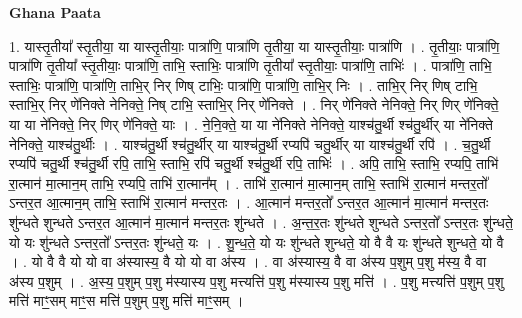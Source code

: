 \documentclass[17pt]{extarticle}
\begin{document}
\textbf{Ghana Paata } \newline

1. यास्तृ॒तीया᳚ स्तृ॒तीया॒ या यास्तृ॒तीयाः॒ पात्रा॑णि॒ पात्रा॑णि तृ॒तीया॒ या यास्तृ॒तीयाः॒ पात्रा॑णि । . तृ॒तीयाः॒ पात्रा॑णि॒ पात्रा॑णि तृ॒तीया᳚ स्तृ॒तीयाः॒ पात्रा॑णि॒ ताभि॒ स्ताभिः॒ पात्रा॑णि तृ॒तीया᳚ स्तृ॒तीयाः॒ पात्रा॑णि॒ ताभिः॑ । . पात्रा॑णि॒ ताभि॒ स्ताभिः॒ पात्रा॑णि॒ पात्रा॑णि॒ ताभि॒र् निर् णिष् टाभिः॒ पात्रा॑णि॒ पात्रा॑णि॒ ताभि॒र् निः । . ताभि॒र् निर् णिष् टाभि॒ स्ताभि॒र् निर् णे॑निक्ते नेनिक्ते॒ निष् टाभि॒ स्ताभि॒र् निर् णे॑निक्ते । . निर् णे॑निक्ते नेनिक्ते॒ निर् णिर् णे॑निक्ते॒ या या ने॑निक्ते॒ निर् णिर् णे॑निक्ते॒ याः । . ने॒नि॒क्ते॒ या या ने॑निक्ते नेनिक्ते॒ याश्च॑तु॒र्थी श्च॑तु॒र्थीर् या ने॑निक्ते नेनिक्ते॒ याश्च॑तु॒र्थीः । . याश्च॑तु॒र्थी श्च॑तु॒र्थीर् या याश्च॑तु॒र्थी रप्यपि॑ चतु॒र्थीर् या याश्च॑तु॒र्थी रपि॑ । . च॒तु॒र्थी रप्यपि॑ चतु॒र्थी श्च॑तु॒र्थी रपि॒ ताभि॒ स्ताभि॒ रपि॑ चतु॒र्थी श्च॑तु॒र्थी रपि॒ ताभिः॑ । . अपि॒ ताभि॒ स्ताभि॒ रप्यपि॒ ताभि॑ रा॒त्मान॑ मा॒त्मान॒म् ताभि॒ रप्यपि॒ ताभि॑ रा॒त्मान᳚म् । . ताभि॑ रा॒त्मान॑ मा॒त्मान॒म् ताभि॒ स्ताभि॑ रा॒त्मान॑ मन्तर॒तो᳚ ऽन्तर॒त आ॒त्मान॒म् ताभि॒ स्ताभि॑ रा॒त्मान॑ मन्तर॒तः । . आ॒त्मान॑ मन्तर॒तो᳚ ऽन्तर॒त आ॒त्मान॑ मा॒त्मान॑ मन्तर॒तः शु॑न्धते शुन्धते ऽन्तर॒त आ॒त्मान॑ मा॒त्मान॑ मन्तर॒तः शु॑न्धते । . अ॒न्त॒र॒तः शु॑न्धते शुन्धते ऽन्तर॒तो᳚ ऽन्तर॒तः शु॑न्धते॒ यो यः शु॑न्धते ऽन्तर॒तो᳚ ऽन्तर॒तः शु॑न्धते॒ यः । . शु॒न्ध॒ते॒ यो यः शु॑न्धते शुन्धते॒ यो वै वै यः शु॑न्धते शुन्धते॒ यो वै । . यो वै वै यो यो वा अ॑स्यास्य॒ वै यो यो वा अ॑स्य । . वा अ॑स्यास्य॒ वै वा अ॑स्य प॒शुम् प॒शु म॑स्य॒ वै वा अ॑स्य प॒शुम् । . अ॒स्य॒ प॒शुम् प॒शु म॑स्यास्य प॒शु मत्त्यत्ति॑ प॒शु म॑स्यास्य प॒शु मत्ति॑ । . प॒शु मत्त्यत्ति॑ प॒शुम् प॒शु मत्ति॑ माꣳ॒॒सम् माꣳ॒॒स मत्ति॑ प॒शुम् प॒शु मत्ति॑ माꣳ॒॒सम् । \newline
\end{document}
